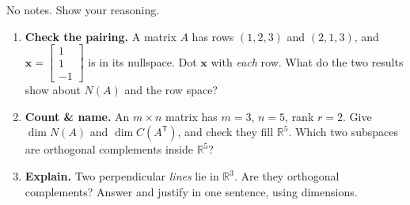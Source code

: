 \documentclass[10pt]{article}
\newcommand{\xx}{\mathbf{x}}
\newcommand{\T}{\mathsf{T}}
\begin{document}
\namedateperiod

\vspace{0.15in}

No notes. Show your reasoning.

\begin{enumerate}[leftmargin=1.8em, itemsep=15pt]
  \item \textbf{Check the pairing.} A matrix $A$ has rows $(1,2,3)$ and $(2,1,3)$, and
        $\xx=\begin{bmatrix} 1 \\ 1 \\ -1 \end{bmatrix}$ is in its nullspace. Dot $\xx$ with
        \emph{each} row. What do the two results show about $N(A)$ and the row space?
        \vspace{1.5cm}
  \item \textbf{Count \& name.} An $m\times n$ matrix has $m=3$, $n=5$, rank $r=2$. Give
        $\dim N(A)$ and $\dim C(A^{\T})$, and check they fill $\mathbb{R}^5$. Which two subspaces are
        orthogonal complements inside $\mathbb{R}^5$?
  \item \textbf{Explain.} Two perpendicular \emph{lines} lie in $\mathbb{R}^3$. Are they orthogonal
        complements? Answer and justify in one sentence, using dimensions.
\end{enumerate}
\end{document}
